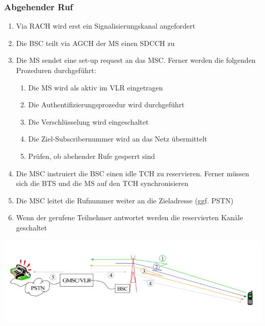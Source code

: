 \subsubsection{Abgehender Ruf}
\begin{minipage}{0.5 \linewidth}
\begin{enumerate}
\item Via RACH wird erst ein Signalisierungskanal angefordert
\item Die BSC teilt via AGCH der MS einen SDCCH zu
\item Die MS sendet eine set-up request an das MSC. Ferner werden die folgenden Prozeduren durchgeführt:
\begin{enumerate}
\item Die MS wird als aktiv im VLR eingetragen
\item Die Authentifizierungsprozedur wird durchgeführt
\item Die Verschlüsselung wird eingeschaltet
\item Die Ziel-Subscribernummer wird an das Netz übermittelt
\item Prüfen, ob abehender Rufe gesperrt sind
\end{enumerate}
\item Die MSC instruiert die BSC einen idle TCH zu reservieren. Ferner müssen sich die BTS und die MS auf den TCH synchronisieren
\item Die MSC leitet die Rufnummer weiter an die Zieladresse (ggf. PSTN)
\item Wenn der gerufene Teilnehmer antwortet werden die reservierten Kanäle geschaltet
\end{enumerate}
\end{minipage}
\begin{minipage}{0.5 \linewidth}
\includegraphics[width = \linewidth]{./Pics/GSMRuf}
\end{minipage}

